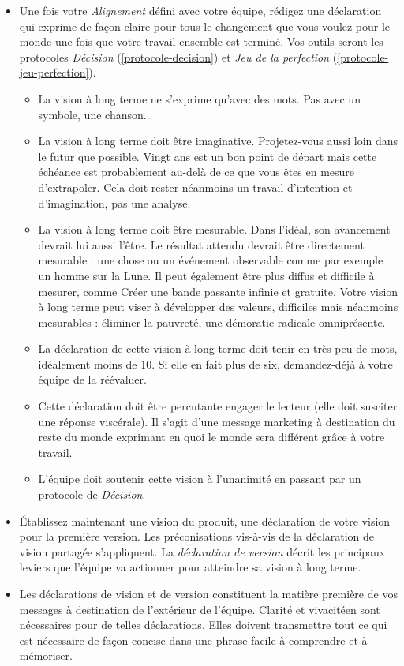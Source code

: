 \documentclass[11pt]{book}
\newcommand*{\numref}[1]{{\hyperref[{#1}]{\autoref*{#1}}}}
\begin{document}
\begin{itemize}
	\item Une fois votre \emph{Alignement} défini avec votre équipe, rédigez une déclaration qui exprime de façon claire
	      pour tous le changement que vous voulez pour le monde une fois que votre travail ensemble est terminé. 
	      Vos outils seront les protocoles \emph{Décision} (\numref{protocole-decision}) et \emph{Jeu de la perfection}
	      (\numref{protocole-jeu-perfection}). 
	      \begin{itemize}
	      	\item La vision à long terme ne s'exprime qu'avec des mots. Pas avec un symbole, une chanson...
	      	\item La vision à long terme doit être imaginative. Projetez-vous aussi loin dans le futur que possible. 
	      	      Vingt ans est un bon point de départ mais cette échéance est probablement au-delà de ce que vous
	      	      êtes en mesure d'extrapoler. Cela doit rester néanmoins un travail d'intention et d'imagination, 
	      	      pas une analyse.
	      	\item La vision à long terme doit être mesurable. Dans l'idéal, son avancement devrait lui aussi l'être.
	      	      Le résultat attendu devrait être directement mesurable : une chose ou un événement observable comme
	      	      par exemple \og{}un homme sur la Lune\fg{}. Il peut également être plus diffus et difficile à mesurer, 
	      	      comme \og{}Créer une bande passante infinie et gratuite\fg{}. Votre vision à long terme peut viser à 
	      	      développer des valeurs, difficiles mais néanmoins mesurables : \og{}éliminer la pauvreté\fg{},
	      	      \og{}une démoratie radicale omniprésente\fg{}.
			\item La déclaration de cette vision à long terme doit tenir en très peu de mots, idéalement moins de 10.
			      Si elle en fait plus de six, demandez-déjà à votre équipe de la réévaluer. 
			\item Cette déclaration doit être percutante engager le lecteur (elle doit susciter une réponse viscérale).
			      Il s'agit d'une message marketing à destination du reste du monde exprimant en quoi le monde sera
			      différent grâce à votre travail.
			\item L'équipe doit soutenir cette vision à l'unanimité en passant par un protocole de \emph{Décision}.
	      \end{itemize}
	\item Établissez maintenant une vision du produit, une déclaration de votre vision pour la première version. Les 
	      préconisations vis-à-vis de la déclaration de vision partagée s'appliquent. La \emph{déclaration de version}
	      décrit les principaux leviers que l'équipe va actionner pour atteindre sa vision à long terme.
	\item Les déclarations de vision et de version constituent la matière première de vos messages à destination de
	      l'extérieur de l'équipe. Clarité et vivacitéen sont nécessaires pour de telles déclarations. Elles doivent
	      transmettre tout ce qui est nécessaire de façon concise dans une phrase facile à comprendre et à mémoriser.
\end{itemize}
\end{document}

